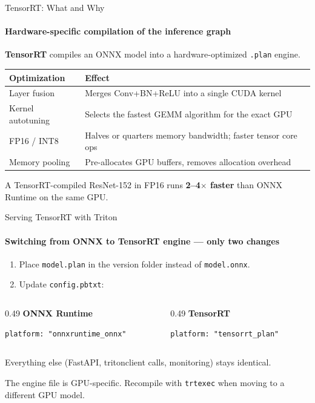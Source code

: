 \documentclass[aspectratio=169]{beamer}
\newcommand{\dbox}[1]{
\begin{mdframed}[roundcorner=3pt, backgroundcolor=yellow, linewidth=0]
\vspace{1mm}
{#1}
\vspace{1mm}
\end{mdframed}
}
\begin{document}
\begin{frame}[t]{TensorRT: What and Why}
\framesubtitle{Hardware-specific compilation of the inference graph}
\textbf{TensorRT} compiles an ONNX model into a hardware-optimized \texttt{.plan} engine.
\vspace{2mm}
\begin{tabular}{@{}p{3.0cm}p{8.2cm}@{}}
\toprule
Optimization & Effect \\
\midrule
Layer fusion & Merges Conv+BN+ReLU into a single CUDA kernel \\
Kernel autotuning & Selects the fastest GEMM algorithm for the exact GPU \\
FP16 / INT8 & Halves or quarters memory bandwidth; faster tensor core ops \\
Memory pooling & Pre-allocates GPU buffers, removes allocation overhead \\
\bottomrule
\end{tabular}

A TensorRT-compiled ResNet-152 in FP16 runs \textbf{2--4$\times$ faster} than ONNX Runtime on the same GPU.
\end{frame}


\begin{frame}[t,fragile]{Serving TensorRT with Triton}
\framesubtitle{Switching from ONNX to TensorRT engine --- only two changes}
\begin{enumerate}
    \item Place \texttt{model.plan} in the version folder instead of \texttt{model.onnx}.
    \item Update \texttt{config.pbtxt}:
\end{enumerate}
\vspace{2mm}
\begin{columns}[T,onlytextwidth]
    \begin{column}{0.49\textwidth}
        \textbf{ONNX Runtime}
\begin{lstlisting}[basicstyle=\footnotesize\ttfamily]
platform: "onnxruntime_onnx"
\end{lstlisting}
    \end{column}
    \begin{column}{0.49\textwidth}
        \textbf{TensorRT}
\begin{lstlisting}[basicstyle=\footnotesize\ttfamily]
platform: "tensorrt_plan"
\end{lstlisting}
    \end{column}
\end{columns}
\vspace{2mm}
Everything else (FastAPI, tritonclient calls, monitoring) stays identical.
\dbox{The engine file is GPU-specific. Recompile with \texttt{trtexec} when moving to a different GPU model.}
\end{frame}
\end{document}
